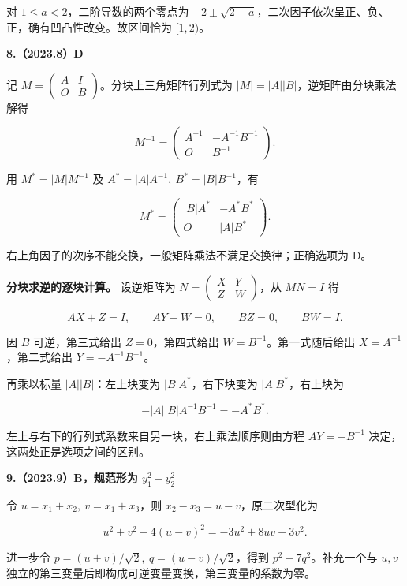 \documentclass[UTF8,11pt,fontset=windows]{ctexart}
\begin{document}
对 $1\le a<2$，二阶导数的两个零点为 $-2\pm\sqrt{2-a}$，二次因子依次呈正、负、正，确有凹凸性改变。故区间恰为 $[1,2)$。

\clearpage

\textbf{8.（2023.8）D}

记 $M=\begin{pmatrix}A&I\\O&B\end{pmatrix}$。分块上三角矩阵行列式为 $|M|=|A||B|$，逆矩阵由分块乘法解得

$$
M^{-1}=\begin{pmatrix}A^{-1}&-A^{-1}B^{-1}\\O&B^{-1}\end{pmatrix}.
$$

用 $M^*=|M|M^{-1}$ 及 $A^*=|A|A^{-1},\ B^*=|B|B^{-1}$，有

$$
M^*=\begin{pmatrix}|B|A^*&-A^*B^*\\O&|A|B^*\end{pmatrix}.
$$

右上角因子的次序不能交换，一般矩阵乘法不满足交换律；正确选项为 D。

\textbf{分块求逆的逐块计算。} 设逆矩阵为 $N=\begin{pmatrix}X&Y\\Z&W\end{pmatrix}$，从 $MN=I$ 得

$$
AX+Z=I,\qquad AY+W=0,\qquad BZ=0,\qquad BW=I.
$$

因 $B$ 可逆，第三式给出 $Z=0$，第四式给出 $W=B^{-1}$。第一式随后给出 $X=A^{-1}$，第二式给出 $Y=-A^{-1}B^{-1}$。

再乘以标量 $|A||B|$：左上块变为 $|B|A^*$，右下块变为 $|A|B^*$，右上块为

$$
-|A||B|A^{-1}B^{-1}=-A^*B^*.
$$

左上与右下的行列式系数来自另一块，右上乘法顺序则由方程 $AY=-B^{-1}$ 决定，这两处正是选项之间的区别。

\clearpage

\textbf{9.（2023.9）B，规范形为 $y_1^2-y_2^2$}

令 $u=x_1+x_2,\ v=x_1+x_3$，则 $x_2-x_3=u-v$，原二次型化为

$$
u^2+v^2-4(u-v)^2=-3u^2+8uv-3v^2.
$$

进一步令 $p=(u+v)/\sqrt2,\ q=(u-v)/\sqrt2$，得到 $p^2-7q^2$。补充一个与 $u,v$ 独立的第三变量后即构成可逆变量变换，第三变量的系数为零。
\end{document}
